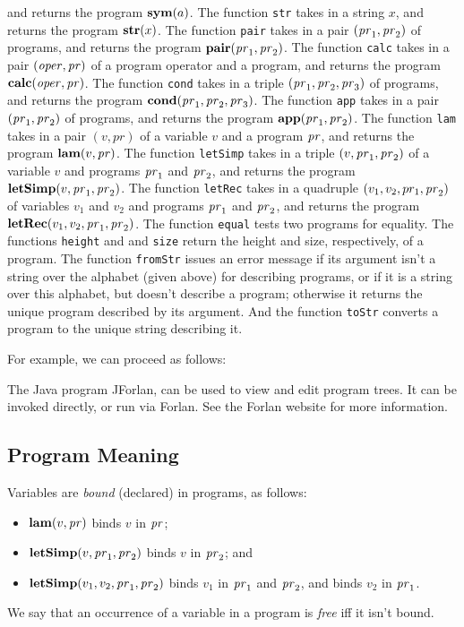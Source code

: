 and returns the program $\mathbf{sym}(a)$.
The function \texttt{str} takes in a string $x$,
and returns the program $\mathbf{str}(x)$.
The function \texttt{pair} takes in a pair $(\mathit{pr}_1,\mathit{pr}_2)$ of programs,
and returns the program $\mathbf{pair}(\mathit{pr}_1,\mathit{pr}_2)$.
The function \texttt{calc} takes in a pair $(\mathit{oper},\mathit{pr})$ of a
program operator and a program, and returns the program
$\mathbf{calc}(\mathit{oper},\mathit{pr})$.
The function \texttt{cond} takes in a triple $(\mathit{pr}_1,\mathit{pr}_2,\mathit{pr}_3)$ of programs,
and returns the program $\mathbf{cond}(\mathit{pr}_1,\mathit{pr}_2,\mathit{pr}_3)$.
The function \texttt{app} takes in a pair $(\mathit{pr}_1,\mathit{pr}_2)$ of programs,
and returns the program $\mathbf{app}(\mathit{pr}_1,\mathit{pr}_2)$.
The function \texttt{lam} takes in a pair $(v,pr)$ of a variable $v$
and a program $\mathit{pr}$, and returns the program
$\mathbf{lam}(v,\mathit{pr})$.
The function \texttt{letSimp} takes in a triple $(v,\mathit{pr}_1,\mathit{pr}_2)$ of a
variable $v$ and programs $\mathit{pr}_1$ and $\mathit{pr}_2$, and returns the program
$\mathbf{letSimp}(v,\mathit{pr}_1,\mathit{pr}_2)$.
The function \texttt{letRec} takes in a quadruple
$(v_1,v_2,pr_1,\mathit{pr}_2)$ of variables $v_1$ and $v_2$ and programs
$\mathit{pr}_1$ and $\mathit{pr}_2$, and returns the program
$\mathbf{letRec}(v_1,v_2,\mathit{pr}_1,\mathit{pr}_2)$.
The function \texttt{equal} tests two programs for equality.
The functions \texttt{height} and and \texttt{size} return the height
and size, respectively, of a program.
The function \texttt{fromStr} issues an error message if its argument
isn't a string over the alphabet (given above) for describing
programs, or if it is a string over this alphabet, but doesn't
describe a program; otherwise it returns the unique program described
by its argument.  And the function \texttt{toStr} converts a program
to the unique string describing it.

For example, we can proceed as follows:


%
The Java program JForlan, can be used to view and edit program trees.
It can be invoked directly, or run via Forlan.  See the Forlan website
for more information.

%

\subsection{Program Meaning}

%
%
Variables are \emph{bound} (declared) in programs, as follows:
\begin{itemize}
\item $\mathbf{lam}(v, \mathit{pr})$ binds $v$ in $\mathit{pr}$;

\item $\mathbf{letSimp}(v, \mathit{pr}_1, \mathit{pr}_2)$ binds $v$ in $\mathit{pr}_2$; and

\item $\mathbf{letSimp}(v_1, v_2, \mathit{pr}_1, \mathit{pr}_2)$ binds $v_1$ in $\mathit{pr}_1$ and
  $\mathit{pr}_2$, and binds $v_2$ in $\mathit{pr}_1$.
\end{itemize}
We say that an occurrence of a variable in a program is \emph{free} iff
it isn't bound.

